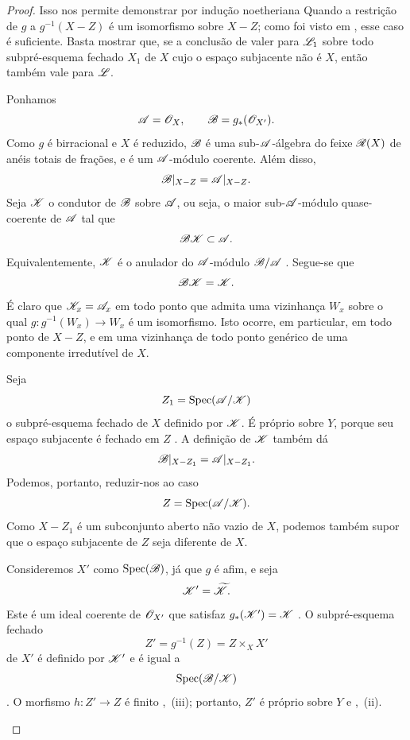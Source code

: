 \begin{proof}

Isso nos permite demonstrar  por indução noetheriana
 Quando a restrição de $g$ a $g^{-1}(X-Z)$ é um
isomorfismo sobre $X-Z$; como foi visto em , esse caso é
suficiente.
Basta mostrar que, se a conclusão de  valer
para $\mathscr{L}_1$ sobre todo subpré-esquema fechado $X_1$ de $X$ cujo
o espaço subjacente não é $X$, então também vale para $\mathscr{L}$.

\begin{env}[2.6.2.4]
\label{III.2.6.2.4}
Ponhamos
\[
  \mathscr{A}=\mathscr{O}_X,
  \qquad
  \mathscr{B}=g_*(\mathscr{O}_{X'}).
\]
Como $g$ é birracional e $X$ é reduzido, $\mathscr{B}$ é uma
sub-$\mathscr{A}$-álgebra do feixe $\mathscr{R}(X)$ de anéis totais de frações,
e é um $\mathscr{A}$-módulo coerente.
Além disso,
\[
  \mathscr{B}|_{X-Z}=\mathscr{A}|_{X-Z}.
\]
Seja $\mathscr{K}$ o condutor de $\mathscr{B}$ sobre $\mathscr{A}$, ou seja, o maior
sub-$\mathscr{A}$-módulo quase-coerente de $\mathscr{A}$ tal que
\[
  \mathscr{B}\mathscr{K}\subset\mathscr{A}.
\]
Equivalentemente, $\mathscr{K}$ é o anulador do
$\mathscr{A}$-módulo $\mathscr{B}/\mathscr{A}$ .
Segue-se que
\[
  \mathscr{B}\mathscr{K}=\mathscr{K}.
\]
É claro que $\mathscr{K}_x=\mathscr{A}_x$ em todo ponto que admita uma vizinhança
$W_x$ sobre o qual $g:g^{-1}(W_x)\to W_x$ é um isomorfismo.
Isto ocorre, em particular, em todo ponto de $X-Z$, e em uma
vizinhança de todo ponto genérico de uma componente irredutível de
$X$.

Seja
\[
  Z_1=\operatorname{Spec}(\mathscr{A}/\mathscr{K})
\]
o subpré-esquema fechado de $X$ definido por $\mathscr{K}$.
É próprio sobre $Y$, porque seu espaço subjacente é fechado em $Z$
.
A definição de $\mathscr{K}$ também dá
\[
  \mathscr{B}|_{X-Z_1}=\mathscr{A}|_{X-Z_1}.
\]
Podemos, portanto, reduzir-nos ao caso
\[
  Z=\operatorname{Spec}(\mathscr{A}/\mathscr{K}).
\]
Como $X-Z_1$ é um subconjunto aberto não vazio de $X$, podemos também
supor que o espaço subjacente de $Z$ seja diferente de $X$.
\end{env}

\begin{env}[2.6.2.5]
\label{III.2.6.2.5}
Consideremos $X'$ como $\operatorname{Spec}(\mathscr{B})$, já que $g$ é afim, e seja
\[
  \mathscr{K}'=\widetilde{\mathscr{K}}.
\]
Este é um ideal coerente de $\mathscr{O}_{X'}$ que satisfaz
$g_*(\mathscr{K}')=\mathscr{K}$ .
O subpré-esquema fechado
\[
  Z'=g^{-1}(Z)=Z\times_X X'
\]
de $X'$ é definido por $\mathscr{K}'$ e é igual a
\[
  \operatorname{Spec}(\mathscr{B}/\mathscr{K})
\]
.
O morfismo $h:Z'\to Z$ é finito ,~(iii);
portanto, $Z'$ é próprio sobre $Y$  e
,~(ii).


\end{env}
\end{proof}
